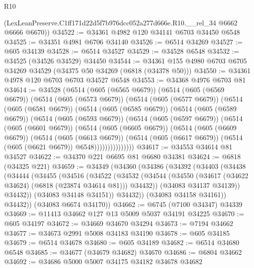 \begin{lexlean}{R10}
\begin{coremodule}
      (LexLeanPreserve.C1ff171d22d5f7b976dcc052a277d666e.R10.__rel_34 @6662 @6666 @6670))
@34522 := @34361 @4982 @120 @34141 @6703 @34450 @6548
@34525 := @34351 @4981 @6706 @34140
@34526 := @6514 @34269
@34527 := @605 @34139
@34528 := @6514 @34527
@34529 := @34528 @6548
@34532 := @34525 (@34526 @34529) @34450
@34544 := @34361 @155 @4980 @6703 @6705 @34269 @34529 (@34375 @50 @34269 (@6818 (@34378 @50)))
@34550 := @34361 @4978 @120 @6703 @6703 @34527 @6548
@34553 := @34368 @4976 @6703 @81
@34614 := @34528
    (@6514
      (@605 (@6565 @6679))
      (@6514
        (@605 (@6569 @6679))
        (@6514
          (@605 (@6573 @6679))
          (@6514
            (@605 (@6577 @6679))
            (@6514
              (@605 (@6581 @6679))
              (@6514
                (@605 (@6585 @6679))
                (@6514
                  (@605 (@6589 @6679))
                  (@6514
                    (@605 (@6593 @6679))
                    (@6514
                      (@605 (@6597 @6679))
                      (@6514
                        (@605 (@6601 @6679))
                        (@6514
                          (@605 (@6605 @6679))
                          (@6514
                            (@605 (@6609 @6679))
                            (@6514
                              (@605 (@6613 @6679))
                              (@6514
                                (@605 (@6617 @6679))
                                (@6514 (@605 (@6621 @6679)) @6548)))))))))))))))
@34617 := @34553 @34614 @81 @34527
@34622 := @34370 @221 @6695 @81 @6680 @34381
@34624 := @6818 (@34325 @221)
@34659 := @34349
    (@34360
      (@34386
        (@34392
          (@34403
            (@34438
              (@34444
                (@34455
                  (@34516
                    (@34522
                      (@34532
                        (@34544
                          (@34550 (@34617 (@34622 @34624) (@6818 (@23874 @34614 @81))) @34432))
                        (@34083 @34137 @34139))
                      @34432))
                  (@34083 @34148 @34151))
                @34432))
            (@34083 @34158 @34161))
          @34432))
      (@34083 @6674 @34170))
@34662 := @6745 (@7100 @34347) @34339
@34669 := @11413 @34662 @127 @13 @5009 @5037 @34191 @34225
@34670 := @605 @34197
@34672 := @34669 @34670 @34294
@34673 := @7194 @34662
@34677 := @34673 @2991 @5008 @34183 @34190
@34678 := @605 @34185
@34679 := @6514 @34678
@34680 := @605 @34189
@34682 := @6514 @34680 @6548
@34685 := @34677 (@34679 @34682) @34670
@34686 := @6804 @34662
@34692 := @34686 @5000 @5007 @34175 @34182 @34678 @34682

\end{coremodule}
\end{lexlean}
